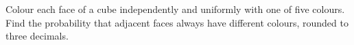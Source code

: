 Colour each face of a cube independently and uniformly with one of five colours. Find the probability that adjacent faces always have different colours, rounded to three decimals.
